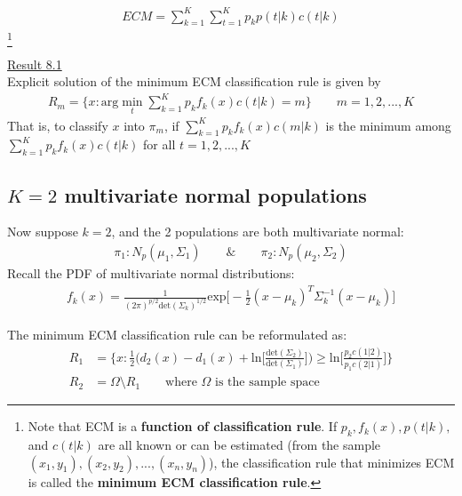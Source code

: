 \documentclass[12pt]{extarticle}
\newcommand{\<}{\langle}
\renewcommand{\>}{\rangle}
\theoremstyle{definition}
\begin{document}
\newpage
\begin{tcolorbox}[enhanced, drop fuzzy shadow, title=ECM: Expected Cost of Missclassification]
\begin{align*}
    ECM=\sum^K_{k=1}\sum^K_{t=1} p_k p(t|k) c(t|k)
\end{align*}
\footnote{Note that ECM is a \textbf{function of classification rule}. If $p_k, f_k(x), p(t|k),$ and $c(t|k)$ are all known or can be estimated (from the sample $(x_1, y_1),(x_2, y_2),...,(x_n, y_n)$), the classification rule that minimizes ECM is called the \textbf{minimum ECM classification rule}.}
\end{tcolorbox}
\underline{Result 8.1}\\
Explicit solution of the minimum ECM classification rule is given by
\begin{align*}
    R_m = \{x: \text{arg}\min_t \sum^K_{k=1}p_k f_k(x) c(t|k) =m \} \qquad m=1,2,...,K
\end{align*}
That is, to classify $x$ into $\pi_m$, if $\sum^K_{k=1}p_k f_k(x) c(m|k)$ is the minimum among $\sum^K_{k=1}p_k f_k(x) c(t|k)$ for all $t=1,2,...,K$

\subsection{$K=2$ multivariate normal populations}
Now suppose $k=2$, and the 2 populations are both multivariate normal:
\begin{align*}
    \pi_1: N_p(\mu_1,\Sigma_1) \qquad \& \qquad \pi_2: N_p(\mu_2,\Sigma_2)
\end{align*}
Recall the PDF of multivariate normal distributions:
\begin{align*}
    f_k(x) = \frac{1}{(2\pi)^{p/2} \text{det}(\Sigma_k)^{1/2}} \text{exp}\bigg[-\frac{1}{2}(x-\mu_k)^T\Sigma^{-1}_k (x-\mu_k) \bigg]
\end{align*}

\begin{tcolorbox}[enhanced, drop fuzzy shadow, title=Minimum ECM when K equal 2 MVN]
The minimum ECM classification rule can be reformulated as:
\begin{align*}
    R_1 &= \Bigg\{x:\frac{1}{2}\bigg( d_2(x)-d_1(x) +\text{ln}\bigg[ \frac{\text{det}(\Sigma_2)}{\text{det}(\Sigma_1)}\bigg]\bigg) \geq \text{ln}\bigg[\frac{p_2 c(1|2)}{p_1 c(2|1)}\bigg] \Bigg\} \\
    R_2 &= \Omega \setminus R_1 \qquad \text{where $\Omega$ is the sample space}
\end{align*}
\end{tcolorbox}
\end{document}
